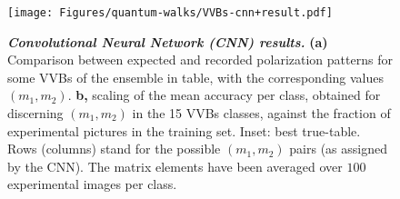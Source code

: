 \begin{figure}
    \centering
    \texttt{[image: Figures/quantum-walks/VVBs-cnn+result.pdf]}
    \caption{
	    \textbf{\emph{Convolutional Neural Network (CNN) results.}}
	    \textbf{(a)} Comparison between expected and recorded polarization patterns for some \ac{VVB}s of the ensemble in table, with the corresponding values $(m_1,m_2)$. 
	    {\bf b,} scaling of the mean accuracy per class, obtained for discerning $(m_1, m_2)$ in the 15 \ac{VVB}s classes,
	    against the fraction of experimental pictures in the training set. 
	    Inset: best true-table. %
	    Rows (columns) stand for the possible $(m_1,m_2)$ pairs (as assigned by the CNN). The matrix elements have been averaged over $100$ experimental images per class. 
    }
    \label{fig:resultsCNN}
\end{figure}

